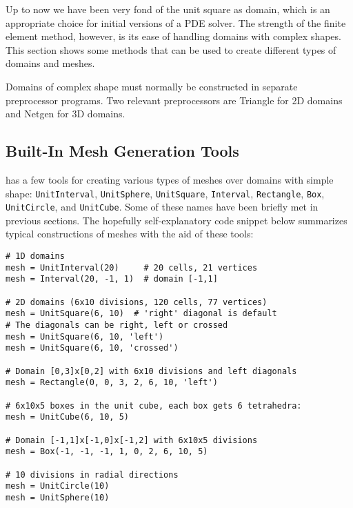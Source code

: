 Up to now we have been very fond of the unit square as domain,
which is an appropriate choice for initial versions of a 
PDE solver. The strength of the finite element method, however, is its
ease of handling domains with complex shapes. This section 
shows some methods that can be used to create different types of
domains and meshes.

Domains of complex shape must normally be constructed in separate
preprocessor programs. Two relevant preprocessors are Triangle for
2D domains and Netgen for 3D domains.

\subsection{Built-In Mesh Generation Tools}
\label{langtangen:prepro:builtin}

\dolfin{} has a few tools for creating various types of meshes over
domains with simple
shape:
{\fontsize{12pt}{12pt}\texttt{UnitInterval}},
{\fontsize{12pt}{12pt}\texttt{UnitSphere}},
{\fontsize{12pt}{12pt}\texttt{UnitSquare}},
{\fontsize{12pt}{12pt}\texttt{Interval}},
{\fontsize{12pt}{12pt}\texttt{Rectangle}},
{\fontsize{12pt}{12pt}\texttt{Box}},
{\fontsize{12pt}{12pt}\texttt{UnitCircle}},
and
{\fontsize{12pt}{12pt}\texttt{UnitCube}}.
Some of these names have been briefly met in previous sections.
The hopefully self-explanatory code snippet below summarizes 
typical constructions of meshes with the aid of these tools:
\begin{Verbatim}[fontsize=\fontsize{10pt}{10pt},tabsize=8,baselinestretch=1.05,
fontfamily=tt,xleftmargin=7mm]
# 1D domains
mesh = UnitInterval(20)     # 20 cells, 21 vertices
mesh = Interval(20, -1, 1)  # domain [-1,1]

# 2D domains (6x10 divisions, 120 cells, 77 vertices)
mesh = UnitSquare(6, 10)  # 'right' diagonal is default
# The diagonals can be right, left or crossed
mesh = UnitSquare(6, 10, 'left')
mesh = UnitSquare(6, 10, 'crossed')

# Domain [0,3]x[0,2] with 6x10 divisions and left diagonals
mesh = Rectangle(0, 0, 3, 2, 6, 10, 'left')

# 6x10x5 boxes in the unit cube, each box gets 6 tetrahedra:
mesh = UnitCube(6, 10, 5)

# Domain [-1,1]x[-1,0]x[-1,2] with 6x10x5 divisions
mesh = Box(-1, -1, -1, 1, 0, 2, 6, 10, 5)

# 10 divisions in radial directions
mesh = UnitCircle(10)  
mesh = UnitSphere(10)
\end{Verbatim}
\noindent

